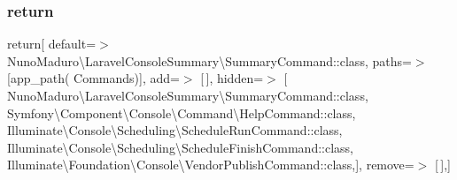 \subsubsection{\texorpdfstring{return}{return}}
{\footnotesize\ttfamily return\mbox{[} \textquotesingle{}default\textquotesingle{}=$>$ Nuno\+Maduro\textbackslash{}\+Laravel\+Console\+Summary\textbackslash{}\+Summary\+Command\+::class, \textquotesingle{}paths\textquotesingle{}=$>$ \mbox{[}app\+\_\+path( \textquotesingle{}Commands\textquotesingle{})\mbox{]}, \textquotesingle{}add\textquotesingle{}=$>$ \mbox{[}$\,$\mbox{]}, \textquotesingle{}hidden\textquotesingle{}=$>$ \mbox{[} Nuno\+Maduro\textbackslash{}\+Laravel\+Console\+Summary\textbackslash{}\+Summary\+Command\+::class, Symfony\textbackslash{}\+Component\textbackslash{}\+Console\textbackslash{}\+Command\textbackslash{}\+Help\+Command\+::class, Illuminate\textbackslash{}\+Console\textbackslash{}\+Scheduling\textbackslash{}\+Schedule\+Run\+Command\+::class, Illuminate\textbackslash{}\+Console\textbackslash{}\+Scheduling\textbackslash{}\+Schedule\+Finish\+Command\+::class, Illuminate\textbackslash{}\+Foundation\textbackslash{}\+Console\textbackslash{}\+Vendor\+Publish\+Command\+::class,\mbox{]}, \textquotesingle{}remove\textquotesingle{}=$>$ \mbox{[}$\,$\mbox{]},\mbox{]}}


